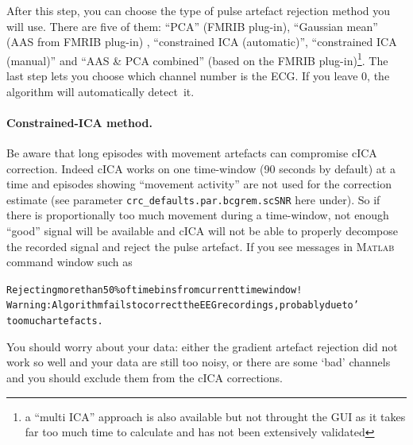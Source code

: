\documentclass[a4paper,titlepage]{article}
\newcommand{\matlab}{\textsc{Matlab }}
\begin{document}
After this step, you can choose the type of pulse artefact rejection method you will use. There are five of them: ``PCA'' (FMRIB plug-in), ``Gaussian mean'' (AAS from FMRIB plug-in) \cite{Niazy2005,Iannetti2005a}, ``constrained ICA (automatic)'', ``constrained ICA (manual)'' \cite{Leclercq2009} and ``AAS \& PCA combined'' (based on the FMRIB plug-in)\footnote{a ``multi ICA'' approach \cite{Phillips2006} is also available but not throught the GUI as it takes far too much time to calculate and has not been extensively validated}. The last step lets you choose which channel number is the ECG. If you leave 0, the algorithm will automatically detect~it.

\paragraph{Constrained-ICA method.}
Be aware that long episodes with movement artefacts can compromise cICA correction. Indeed cICA works on one time-window (90 seconds by default) at a time and episodes showing ``movement activity'' are not used for the correction estimate (see parameter {\tt crc\_defaults.par.bcgrem.scSNR} here under). So if there is proportionally too much movement during a time-window, not enough ``good'' signal will be available and cICA will not be able to properly decompose the recorded signal and reject the pulse artefact. If you see messages in \matlab command window such as 
\begin{alltt}
Rejecting more than 50\% of time bins from current time window!\\
Warning: Algorithm fails to correct the EEG recordings, probably due to'
too much artefacts.        
\end{alltt}
You should worry about your data: either the gradient artefact rejection did not work so well and your data are still too noisy, or there are some `bad' channels and you should exclude them from the cICA corrections.
\end{document}
